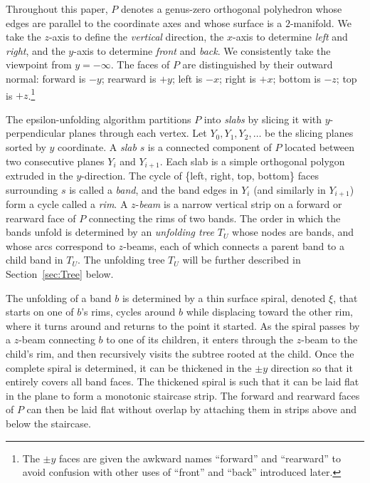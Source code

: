 \documentclass[11pt]{article}
\begin{document}
Throughout this paper,
$P$ denotes a genus-zero orthogonal polyhedron whose edges are parallel to the
coordinate axes and whose surface is a $2$-manifold.
We take the $z$-axis to define the \emph{vertical} direction,
the $x$-axis to determine \emph{left} and \emph{right},
and the $y$-axis to determine \emph{front} and \emph{back}.
We consistently take the viewpoint from $y=-\infty$.
The faces of $P$ are distinguished by their outward normal:
forward is $-y$; rearward is $+y$; left is $-x$; right is $+x$; bottom is $-z$;
top is $+z$.\footnote{The $\pm y$ faces are given the awkward names
  ``forward'' and ``rearward'' to avoid confusion with other uses
  of ``front'' and ``back'' introduced later.}



The epsilon-unfolding algorithm partitions $P$ into \emph{slabs}
by slicing
it with $y$-perpendicular planes through each vertex. Let $Y_0, Y_1, Y_2, \dots$
be the slicing planes sorted by $y$ coordinate. A \emph{slab} $s$ is a connected component of
$P$ located between two consecutive planes $Y_i$ and $Y_{i+1}$.
Each slab is a simple orthogonal polygon extruded in the $y$-direction.
The cycle of
\{left, right, top, bottom\} faces surrounding $s$ is called a \emph{band}, and
the band edges in $Y_i$ (and similarly in $Y_{i+1}$) form a cycle called a \emph{rim}.
A $z$-\emph{beam} is a narrow vertical strip on a forward or rearward face of $P$
connecting the rims of two bands.
The order in which the bands unfold is determined
by an \emph{unfolding tree} $T_U$ whose nodes are bands,
and whose arcs correspond to $z$-beams, each of which connects a
parent band to a child band in $T_U$. The unfolding tree
$T_U$ will be further described in Section~\ref{sec:Tree} below.

The unfolding of a band $b$ is determined by
a thin surface spiral, denoted $\xi$, that starts on one of $b$'s rims,
cycles around $b$ while displacing toward the other rim, where it
turns around and returns to the point
it started.  As the spiral passes by a $z$-beam connecting $b$ to one of its children, it enters through the $z$-beam to the child's rim, and then recursively
visits the subtree rooted at the child.
Once the complete spiral is determined, it can be thickened in the $\pm y$ direction so that
it entirely covers all band faces.
The thickened spiral is such that it can be laid flat in the plane to form a
monotonic staircase strip. The forward and rearward faces of $P$ can then be laid flat without overlap
by attaching them in strips above and below the staircase.
\end{document}
